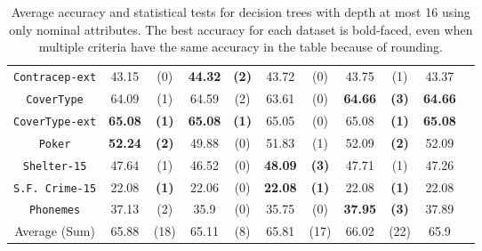\begin{table}
\begin{tabular}{c|cc|cc|cc|cc|cc}
{\tt Contracep-ext} &  43.15       & (0)          &  {\bf 44.32} & {\bf (2)}    &  43.72       & (0)              & 43.75      & (1)          & 43.37      &            \\
{\tt CoverType}     &  64.09       & (1)          &  64.59       & (2)          &  63.61       & (0)              &{\bf 64.66} & {\bf (3)}    & {\bf 64.66}&            \\
{\tt CoverType-ext} &  {\bf 65.08} & {\bf (1)}    &  {\bf 65.08} & {\bf (1)}    &  65.05       & (0)              & 65.08      & {\bf (1)}    & {\bf 65.08}&            \\
{\tt Poker}         &  {\bf 52.24} & {\bf (2)}    &  49.88       & (0)          &  51.83       & (1)              & 52.09      & {\bf (2)}    & 52.09      &            \\
{\tt Shelter-15}    &  47.64       & (1)          &  46.52       & (0)          & {\bf 48.09}  & {\bf (3)}        & 47.71      & (1)          & 47.26      &            \\
{\tt S.F. Crime-15} &  22.08       & {\bf (1)}    &  22.06       & (0)          & {\bf 22.08}  & {\bf (1)}        & 22.08      & {\bf (1)}    & 22.08      &            \\
{\tt Phonemes}      &  37.13       & (2)          &  35.9        & (0)          & 35.75        & (0)              &{\bf 37.95} & {\bf (3)}    & 37.89      &            \\
\hline
Average (Sum)       &  65.88       & (18)         &  65.11       & (8)          & 65.81        & (17)             &  66.02     & (22)         & 65.9       &    
\end{tabular}
\normalsize
\caption{Average accuracy and statistical tests  for  decision trees 
with depth at most 16 using only nominal attributes. The best accuracy for each dataset is bold-faced, even when multiple criteria have the same accuracy in the table because of rounding.}
\label{tab:nominal-16}
\end{table}

